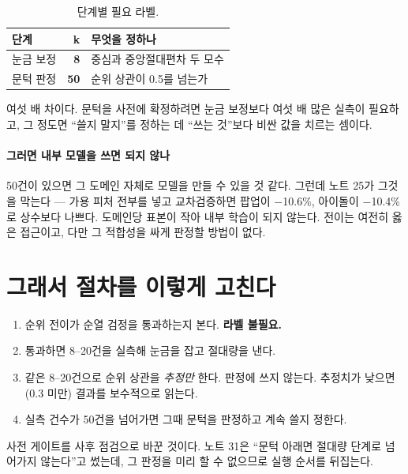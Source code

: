 \documentclass[10pt]{article}
\begin{document}
\begin{table}[t]
\centering\tsize
\caption{단계별 필요 라벨.}
\begin{tabular}{lrl}
\toprule
단계 & k & 무엇을 정하나 \\
\midrule
눈금 보정 & \textbf{8} & 중심과 중앙절대편차 두 모수 \\
문턱 판정 & \textbf{50} & 순위 상관이 0.5를 넘는가 \\
\bottomrule
\end{tabular}
\end{table}

여섯 배 차이다. 문턱을 사전에 확정하려면 눈금 보정보다 여섯 배 많은 실측이
필요하고, 그 정도면 ``쓸지 말지''를 정하는 데 ``쓰는 것''보다 비싼 값을 치르는
셈이다.

\paragraph{그러면 내부 모델을 쓰면 되지 않나}
50건이 있으면 그 도메인 자체로 모델을 만들 수 있을 것 같다. 그런데 노트 25가
그것을 막는다 --- 가용 피처 전부를 넣고 교차검증하면 팝업이 $-$10.6\%, 아이돌이
$-$10.4\%로 상수보다 나쁘다. 도메인당 표본이 작아 내부 학습이 되지 않는다.
전이는 여전히 옳은 접근이고, 다만 그 적합성을 싸게 판정할 방법이 없다.


\section{그래서 절차를 이렇게 고친다}

\begin{enumerate}[leftmargin=1.3em,itemsep=0.2em]
\item 순위 전이가 순열 검정을 통과하는지 본다. \textbf{라벨 불필요.}
\item 통과하면 8--20건을 실측해 눈금을 잡고 절대량을 낸다.
\item 같은 8--20건으로 순위 상관을 \emph{추정만} 한다. 판정에 쓰지 않는다.
      추정치가 낮으면(0.3 미만) 결과를 보수적으로 읽는다.
\item 실측 건수가 50건을 넘어가면 그때 문턱을 판정하고 계속 쓸지 정한다.
\end{enumerate}

사전 게이트를 사후 점검으로 바꾼 것이다. 노트 31은 ``문턱 아래면 절대량 단계로
넘어가지 않는다''고 썼는데, 그 판정을 미리 할 수 없으므로 실행 순서를 뒤집는다.
\end{document}
